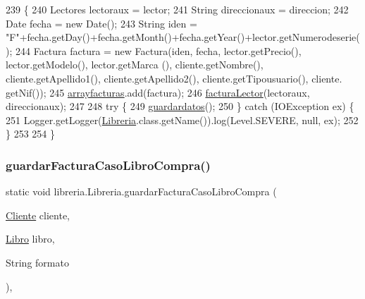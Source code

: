 \begin{DoxyCode}
239                                                                                                      \{
240          Lectores lectoraux = lector;
241          String direccionaux = direccion;
242          Date fecha = \textcolor{keyword}{new} Date();
243          String iden = \textcolor{stringliteral}{"F"}+fecha.getDay()+fecha.getMonth()+fecha.getYear()+lector.getNumerodeserie();
244          Factura factura = \textcolor{keyword}{new} Factura(iden, fecha, lector.getPrecio(), lector.getModelo(), lector.getMarca
      (), cliente.getNombre(), cliente.getApellido1(), cliente.getApellido2(), cliente.getTipousuario(), cliente.
      getNif());
245          \mbox{\hyperlink{classlibreria_1_1_libreria_a1b6aaea2b6d1d95a7e25b85881e82721}{arrayfacturas}}.add(factura);
246          \mbox{\hyperlink{classlibreria_1_1_libreria_a706ac513e37d19235273ec939e4fa8ac}{facturaLector}}(lectoraux, direccionaux);
247          
248      \textcolor{keywordflow}{try} \{
249         \mbox{\hyperlink{classlibreria_1_1_libreria_abc10249e70e74a9ba55a081bbf23cfcd}{guardardatos}}();
250     \} \textcolor{keywordflow}{catch} (IOException ex) \{
251         Logger.getLogger(\mbox{\hyperlink{classlibreria_1_1_libreria_a93220dd4de47ee3b7ef4b2a90701c253}{Libreria}}.class.getName()).log(Level.SEVERE, null, ex);
252     \}
253          
254      \}
\end{DoxyCode}
\mbox{\label{classlibreria_1_1_libreria_a45eb93a6c3196e51a3b37075001ba215}} 
\subsubsection{\texorpdfstring{guardar\+Factura\+Caso\+Libro\+Compra()}{guardarFacturaCasoLibroCompra()}}
{\footnotesize\ttfamily static void libreria.\+Libreria.\+guardar\+Factura\+Caso\+Libro\+Compra (\begin{DoxyParamCaption}\item[{\mbox{\hyperlink{classlibreria_1_1_cliente}{Cliente}}}]{cliente,  }\item[{\mbox{\hyperlink{classlibreria_1_1_libro}{Libro}}}]{libro,  }\item[{String}]{formato }\end{DoxyParamCaption})\hspace{0.3cm}{\ttfamily [inline]}, {\ttfamily [static]}}


